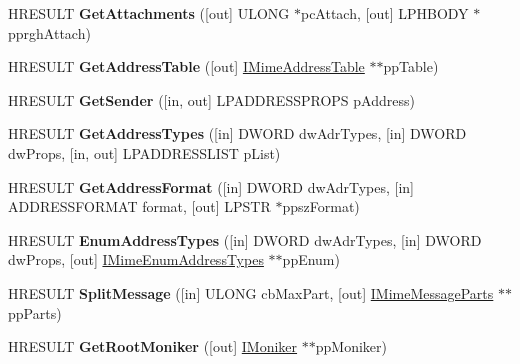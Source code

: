 \begin{DoxyCompactItemize}
H\+R\+E\+S\+U\+LT {\bfseries Get\+Attachments} (\mbox{[}out\mbox{]} U\+L\+O\+NG $\ast$pc\+Attach, \mbox{[}out\mbox{]} L\+P\+H\+B\+O\+DY $\ast$pprgh\+Attach)
\item 
\mbox{\label{interface_m_i_m_e_o_l_e_1_1_i_mime_message_a2b13a4eb55d45d50309c7acba6ea9d8e}} 
H\+R\+E\+S\+U\+LT {\bfseries Get\+Address\+Table} (\mbox{[}out\mbox{]} \hyperlink{interface_m_i_m_e_o_l_e_1_1_i_mime_address_table}{I\+Mime\+Address\+Table} $\ast$$\ast$pp\+Table)
\item 
\mbox{\label{interface_m_i_m_e_o_l_e_1_1_i_mime_message_a267a383cd24523aa9c3ed956f2aa12e6}} 
H\+R\+E\+S\+U\+LT {\bfseries Get\+Sender} (\mbox{[}in, out\mbox{]} L\+P\+A\+D\+D\+R\+E\+S\+S\+P\+R\+O\+PS p\+Address)
\item 
\mbox{\label{interface_m_i_m_e_o_l_e_1_1_i_mime_message_afa8fb6c3642d5ee49ddd762f2d21cab3}} 
H\+R\+E\+S\+U\+LT {\bfseries Get\+Address\+Types} (\mbox{[}in\mbox{]} D\+W\+O\+RD dw\+Adr\+Types, \mbox{[}in\mbox{]} D\+W\+O\+RD dw\+Props, \mbox{[}in, out\mbox{]} L\+P\+A\+D\+D\+R\+E\+S\+S\+L\+I\+ST p\+List)
\item 
\mbox{\label{interface_m_i_m_e_o_l_e_1_1_i_mime_message_a89b9809c8f37a3a8d7933499d688eaed}} 
H\+R\+E\+S\+U\+LT {\bfseries Get\+Address\+Format} (\mbox{[}in\mbox{]} D\+W\+O\+RD dw\+Adr\+Types, \mbox{[}in\mbox{]} A\+D\+D\+R\+E\+S\+S\+F\+O\+R\+M\+AT format, \mbox{[}out\mbox{]} L\+P\+S\+TR $\ast$ppsz\+Format)
\item 
\mbox{\label{interface_m_i_m_e_o_l_e_1_1_i_mime_message_ad3b4ddd7a9ace1003d49af6f1f905c4c}} 
H\+R\+E\+S\+U\+LT {\bfseries Enum\+Address\+Types} (\mbox{[}in\mbox{]} D\+W\+O\+RD dw\+Adr\+Types, \mbox{[}in\mbox{]} D\+W\+O\+RD dw\+Props, \mbox{[}out\mbox{]} \hyperlink{interface_m_i_m_e_o_l_e_1_1_i_mime_enum_address_types}{I\+Mime\+Enum\+Address\+Types} $\ast$$\ast$pp\+Enum)
\item 
\mbox{\label{interface_m_i_m_e_o_l_e_1_1_i_mime_message_a8b1ea3cee5b94a4a2e6b119292aadd7c}} 
H\+R\+E\+S\+U\+LT {\bfseries Split\+Message} (\mbox{[}in\mbox{]} U\+L\+O\+NG cb\+Max\+Part, \mbox{[}out\mbox{]} \hyperlink{interface_m_i_m_e_o_l_e_1_1_i_mime_message_parts}{I\+Mime\+Message\+Parts} $\ast$$\ast$pp\+Parts)
\item 
\mbox{\label{interface_m_i_m_e_o_l_e_1_1_i_mime_message_a56881e7cf1f8b78e3a48857b84143c80}} 
H\+R\+E\+S\+U\+LT {\bfseries Get\+Root\+Moniker} (\mbox{[}out\mbox{]} \hyperlink{interface_i_moniker}{I\+Moniker} $\ast$$\ast$pp\+Moniker)
\end{DoxyCompactItemize}
